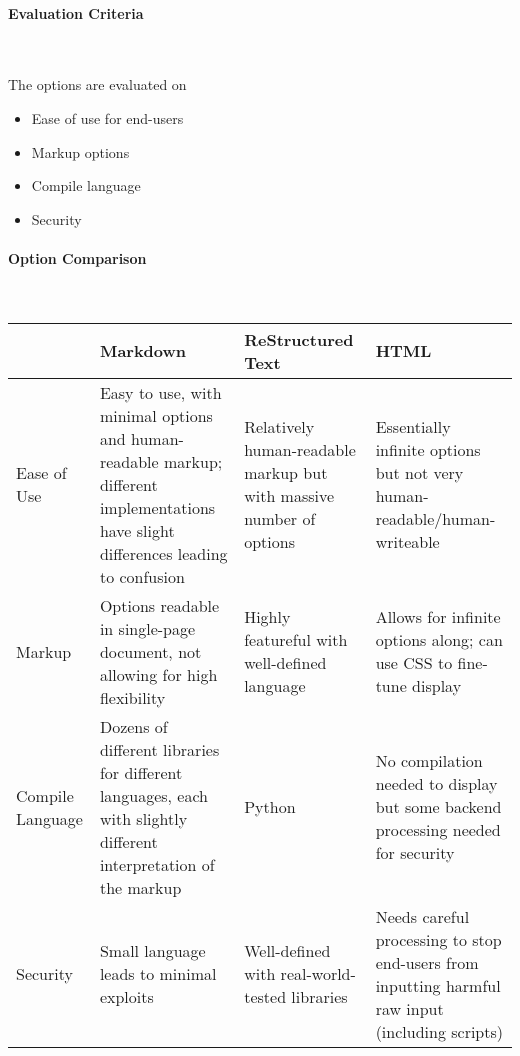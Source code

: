 \documentclass[letterpaper, 10pt, draftclsnofoot, compsoc, onecolumn]{IEEEtran}
\begin{document}
{\medskip
\newpage
\paragraph{Evaluation Criteria} ~\\
{\noindent The options are evaluated on

\begin{itemize}
\item Ease of use for end-users
\item Markup options
\item Compile language
\item Security
\end{itemize}

 \par}


\paragraph{Option Comparison} ~\\
\vspace{1pc}
\tablehead{}
\begin{supertabular}{|p{2cm}|p{4cm}|p{4cm}|p{4cm}|}
\hline
  & Markdown
  & ReStructured Text
  & HTML \\ \hline
Ease of Use
  & Easy to use, with minimal options and human-readable markup; different implementations have slight differences leading to confusion
  & Relatively human-readable markup but with massive number of options
  & Essentially infinite options but not very human-readable/human-writeable  \\ \hline
Markup
  & Options readable in single-page document, not allowing for high flexibility
  & Highly featureful with well-defined language
  & Allows for infinite options along; can use CSS to fine-tune display \\ \hline
Compile Language
  & Dozens of different libraries for different languages, each with slightly different interpretation of the markup
  & Python
  & No compilation needed to display but some backend processing needed for security \\ \hline
Security
  & Small language leads to minimal exploits
  & Well-defined with real-world-tested libraries
  & Needs careful processing to stop end-users from inputting harmful raw input (including scripts)
  \\ \hline
\end{supertabular}

}
\end{document}
